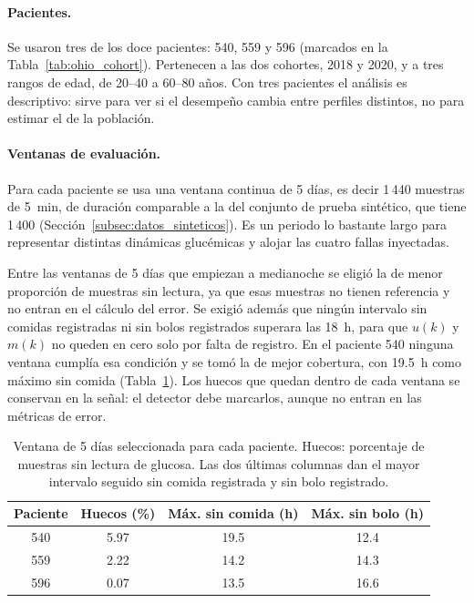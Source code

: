 \documentclass{report}
\begin{document}
\paragraph{Pacientes.} Se usaron tres de los doce pacientes: 540, 559 y 596 (marcados en la Tabla~\ref{tab:ohio_cohort}). Pertenecen a las dos cohortes, 2018 y 2020, y a tres rangos de edad, de 20--40 a 60--80 años. Con tres pacientes el análisis es descriptivo: sirve para ver si el desempeño cambia entre perfiles distintos, no para estimar el de la población.
 
\paragraph{Ventanas de evaluación.} Para cada paciente se usa una ventana continua de 5 días, es decir 1\,440 muestras de 5~min, de duración comparable a la del conjunto de prueba sintético, que tiene 1\,400 (Sección~\ref{subsec:datos_sinteticos}). Es un periodo lo bastante largo para representar distintas dinámicas glucémicas y alojar las cuatro fallas inyectadas.

Entre las ventanas de 5 días que empiezan a medianoche se eligió la de menor proporción de muestras sin lectura, ya que esas muestras no tienen referencia y no entran en el cálculo del error. Se exigió además que ningún intervalo sin comidas registradas ni sin bolos registrados superara las 18~h, para que $u(k)$ y $m(k)$ no queden en cero solo por falta de registro. En el paciente 540 ninguna ventana cumplía esa condición y se tomó la de mejor cobertura, con 19.5~h como máximo sin comida (Tabla~\ref{tab:ohio_ventanas}). Los huecos que quedan dentro de cada ventana se conservan en la señal: el detector debe marcarlos, aunque no entran en las métricas de error.
 
\begin{table}[H]
\centering
\footnotesize
\caption{Ventana de 5 días seleccionada para cada paciente. Huecos: porcentaje de muestras sin lectura de glucosa. Las dos últimas columnas dan el mayor intervalo seguido sin comida registrada y sin bolo registrado.}
\label{tab:ohio_ventanas}
\begin{tabular}{cccc}
\toprule
\textbf{Paciente} & \textbf{Huecos (\%)} & \textbf{Máx. sin comida (h)} & \textbf{Máx. sin bolo (h)} \\
\midrule
540 & 5.97 & 19.5 & 12.4 \\
559 & 2.22 & 14.2 & 14.3 \\
596 & 0.07 & 13.5 & 16.6 \\
\bottomrule
\end{tabular}
\end{table}
\end{document}
